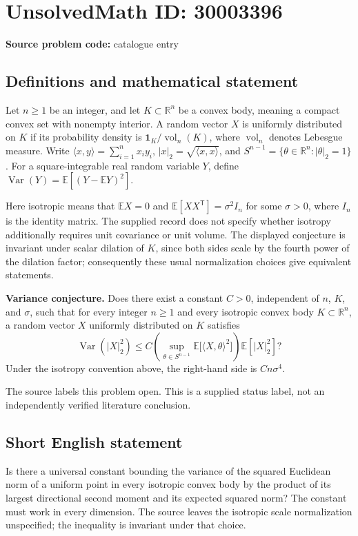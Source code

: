 \documentclass[11pt]{article}
\newcommand{\R}{\mathbb{R}}
\newcommand{\E}{\mathbb{E}}
\begin{document}
\section*{UnsolvedMath ID: 30003396}
\textbf{Source problem code:} catalogue entry
\subsection{Definitions and mathematical statement}
Let \(n\geq 1\) be an integer, and let \(K\subset\R^n\) be a convex body, meaning a compact convex set with nonempty interior. A random vector \(X\) is uniformly distributed on \(K\) if its probability density is \(\mathbf{1}_K/\operatorname{vol}_n(K)\), where \(\operatorname{vol}_n\) denotes Lebesgue measure. Write \(\langle x,y\rangle=\sum_{i=1}^n x_i y_i\), \(|x|_2=\sqrt{\langle x,x\rangle}\), and \(S^{n-1}=\{\theta\in\R^n:|\theta|_2=1\}\). For a square-integrable real random variable \(Y\), define \(\operatorname{Var}(Y)=\E[(Y-\E Y)^2]\).

Here isotropic means that \(\E X=0\) and \(\E[XX^{\mathsf T}]=\sigma^2 I_n\) for some \(\sigma>0\), where \(I_n\) is the identity matrix. The supplied record does not specify whether isotropy additionally requires unit covariance or unit volume. The displayed conjecture is invariant under scalar dilation of \(K\), since both sides scale by the fourth power of the dilation factor; consequently these usual normalization choices give equivalent statements.

\textbf{Variance conjecture.} Does there exist a constant \(C>0\), independent of \(n\), \(K\), and \(\sigma\), such that for every integer \(n\geq1\) and every isotropic convex body \(K\subset\R^n\), a random vector \(X\) uniformly distributed on \(K\) satisfies
\[
\operatorname{Var}(|X|_2^2)
\leq C\left(\sup_{\theta\in S^{n-1}}\E\bigl[\langle X,\theta\rangle^2\bigr]\right)\E[|X|_2^2]?
\]
Under the isotropy convention above, the right-hand side is \(C n\sigma^4\).

The source labels this problem open. This is a supplied status label, not an independently verified literature conclusion.
\subsection{Short English statement}
Is there a universal constant bounding the variance of the squared Euclidean norm of a uniform point in every isotropic convex body by the product of its largest directional second moment and its expected squared norm? The constant must work in every dimension. The source leaves the isotropic scale normalization unspecified; the inequality is invariant under that choice.
\end{document}
